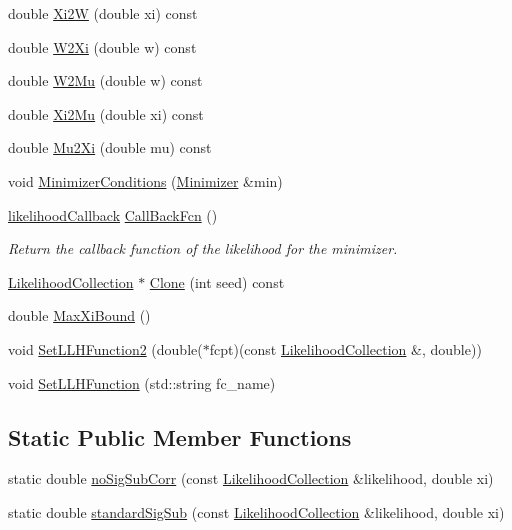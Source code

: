 \begin{DoxyCompactItemize}
\item 
double \hyperlink{classLikelihoodCollection_a794f0baef8300c86905d22e92f9a157e}{Xi2\-W} (double xi) const 
\item 
double \hyperlink{classLikelihoodCollection_a9a1ca7a817d25f9e01d65c4015111ebe}{W2\-Xi} (double w) const 
\item 
double \hyperlink{classLikelihoodCollection_a72719241eded381680815ebdda1e6502}{W2\-Mu} (double w) const 
\item 
double \hyperlink{classLikelihoodCollection_ac7dcd857dcbbe516e9b83a1405422cfb}{Xi2\-Mu} (double xi) const 
\item 
double \hyperlink{classLikelihoodCollection_ad4009a5ffe924948b39d760c9f31f5c3}{Mu2\-Xi} (double mu) const 
\item 
void \hyperlink{classLikelihoodCollection_ae1d445fbfc327da63d469d67891dc7e3}{Minimizer\-Conditions} (\hyperlink{classMinimizer}{Minimizer} \&min)
\item 
\hyperlink{Likelihood_8h_a97d92c5c141f28319e7e8198defc9084}{likelihood\-Callback} \hyperlink{classLikelihoodCollection_af4c889ced5fc4de6be4ffac2898250b5}{Call\-Back\-Fcn} ()
\begin{DoxyCompactList}\small\item\em Return the callback function of the likelihood for the minimizer. \end{DoxyCompactList}\item 
\hyperlink{classLikelihoodCollection}{Likelihood\-Collection} $\ast$ \hyperlink{classLikelihoodCollection_ae3d80984323771199c511db7016608cf}{Clone} (int seed) const 
\item 
double \hyperlink{classLikelihoodCollection_adc81d79fce77d226853f4cfcb33fb7a3}{Max\-Xi\-Bound} ()
\item 
void \hyperlink{classLikelihoodCollection_ade325e0d8eb68213933bf19ea83f8276}{Set\-L\-L\-H\-Function2} (double($\ast$fcpt)(const \hyperlink{classLikelihoodCollection}{Likelihood\-Collection} \&, double))
\item 
void \hyperlink{classLikelihoodCollection_a634e541adaa8965ad06108a6b5cfd4f3}{Set\-L\-L\-H\-Function} (std\-::string fc\-\_\-name)
\end{DoxyCompactItemize}
\subsection*{Static Public Member Functions}
\begin{DoxyCompactItemize}
\item 
static double \hyperlink{classLikelihoodCollection_ae13aea60a6c3e4b44ac0d45f5a93a31f}{no\-Sig\-Sub\-Corr} (const \hyperlink{classLikelihoodCollection}{Likelihood\-Collection} \&likelihood, double xi)
\item 
static double \hyperlink{classLikelihoodCollection_a1db426782d8da3072c54e9670f81880f}{standard\-Sig\-Sub} (const \hyperlink{classLikelihoodCollection}{Likelihood\-Collection} \&likelihood, double xi)
\end{DoxyCompactItemize}
